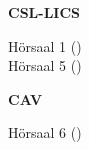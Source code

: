 \documentclass{article}
\begin{document}

\vspace{4cm}

\begin{center}
\begin{vsltext}{2.5cm}{3.5cm}

    \textbf{CSL-LICS}\\

\end{vsltext}
\begin{vsltext}{1.5cm}{2cm}

    Hörsaal 1 (\AreaC)\\
    Hörsaal 5 (\AreaA)

\end{vsltext}

    \vspace{4cm}

\begin{vsltext}{2.5cm}{3.5cm}

    \textbf{CAV}\\

\end{vsltext}
\begin{vsltext}{1.5cm}{2cm}

    Hörsaal 6 (\AreaA)

\end{vsltext}

\end{center}
\end{document}
